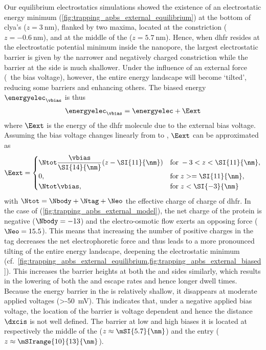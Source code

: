 Our equilibrium electrostatics simulations showed the existence of an electrostatic energy minimum
(\cref{fig:trapping_apbs_external_equilibrium}) at the bottom of \gls{clya}'s \lumen{} ($z = \SI{3}{\nm}$),
flanked by two maxima, located at the \transi{} constriction ($z = \SI{-0.6}{\nm}$), and at the middle of the
\cisi{} \lumen{} ($z = \SI{5.7}{\nm}$). Hence, when \gls{dhfr} resides at the electrostatic potential minimum
inside the nanopore, the largest electrostatic barrier is given by the narrower and negatively charged
\transi{} constriction while the barrier at the \cisi{} side is much shallower. Under the influence of an
external force (\ie~the bias voltage), however, the entire energy landscape will become `tilted', reducing
some barriers and enhancing others. The biased energy $\energyelec_{\vbias}$ is thus
%
\begin{align}\label{eq:external_energy}
  \energyelec_{\vbias} =  \energyelec + \Eext
\end{align}
%
where $\Eext$ is the energy of the \gls{dhfr} molecule due to the external bias voltage. Assuming the bias
voltage changes linearly from \cisi{} to \transi{}, $\Eext$ can be approximated as
%
\begin{align}\label{eq:external_energy_model}
  \Eext =
  \begin{cases}
      \Ntot \dfrac{\vbias}{\SI{14}{\nm}} (z - \SI{11}{\nm})
              & \text{for}\; -3 < z < \SI{11}{\nm},\\
      0,      & \text{for}\;  z >= \SI{11}{\nm},\\
      \Ntot \vbias, & \text{for}\;  z <  \SI{-3}{\nm}
  \end{cases}
\end{align}
%
with $\Ntot = \Nbody + \Ntag + \Neo$ the effective charge of charge of \gls{dhfr}. In the case of
 (\cref{fig:trapping_apbs_external_model}), the net charge of the protein is negative
($\Nbody = -13$) and the electro-osmotic flow exerts an opposing force ($\Neo = 15.5$). This means that
increasing the number of positive charges in the tag decreases the net electrophoretic force and thus leads to
a more pronounced tilting of the entire energy landscape, deepening the electrostatic minimum
(cf.~\cref{fig:trapping_apbs_external_equilibrium,fig:trapping_apbs_external_biased}). This increases the
barrier heights at both the \cisi{} and \transi{} sides similarly, which results in the lowering of both the
\cisi{} and \transi{} escape rates and hence longer dwell times. Because the \cisi{} energy barrier in the
\lumen{} is relatively shallow, it disappears at moderate applied voltages (\SI{>-50}{\mV}). This indicates
that, under a negative applied bias voltage, the location of the \cisi{} barrier is voltage dependent and
hence the distance $\dxcis$ is not well defined. The \cisi{} barrier at low and high biases it is located at
respectively the middle of the \lumen{} ($z \approx \mSI{5.7}{\nm}$) and the \cisi{} entry ($z \approx
\mSIrange{10}{13}{\nm}$).

